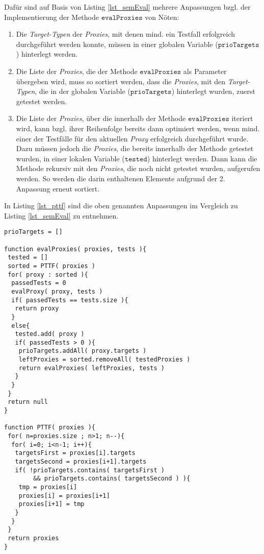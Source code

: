 \newpage
\noindent
Dafür sind auf Basis von Listing \ref{lst_semEval} mehrere Anpassungen bzgl. der Implementierung der Methode $\texttt{evalProxies}$ von Nöten:
\begin{enumerate}
\item 
Die \emph{Target-Typen} der \emph{Proxies}, mit denen mind. ein Testfall erfolgreich durchgeführt werden konnte, müssen in einer globalen Variable ($\texttt{prioTargets}$) hinterlegt werden.

\item 
Die Liste der \emph{Proxies}, die der Methode $\texttt{evalProxies}$ als Parameter übergeben wird, muss so sortiert werden, dass die \emph{Proxies}, mit den \emph{Target-Typen}, die in der globalen Variable ($\texttt{prioTargets}$) hinterlegt wurden, zuerst getestet werden. 

\item 
Die Liste der \emph{Proxies}, über die innerhalb der Methode $\texttt{evalProxies}$ iteriert wird, kann bzgl. ihrer Reihenfolge bereits dann optimiert werden, wenn mind. einer der Testfälle für den aktuellen \emph{Proxy} erfolgreich durchgeführt wurde. Dazu müssen jedoch die \emph{Proxies}, die bereits innerhalb der Methode getestet wurden, in einer lokalen Variable ($\texttt{tested}$) hinterlegt werden. Dann kann die Methode rekursiv mit den \emph{Proxies}, die noch nicht getestet wurden, aufgerufen werden. So werden die darin enthaltenen Elemente aufgrund der 2. Anpassung erneut sortiert.
\end{enumerate}  
In Listing \ref{lst_pttf} sind die oben genannten Anpassungen im Vergleich zu Listing \ref{lst_semEval} zu entnehmen.
\newpage
\begin{lstlisting}[style = pseudo, caption = Semantische Evaluation mit Heuristik \emph{PTTF}, captionpos = b, label = lst_pttf]
prioTargets = []

function evalProxies( proxies, tests ){
 tested = []
 sorted = PTTF( proxies )
 for( proxy : sorted ){
  passedTests = 0
  evalProxy( proxy, tests )
  if( passedTests == tests.size ){
   return proxy
  }
  else{
   tested.add( proxy )
   if( passedTests > 0 ){
    prioTargets.addAll( proxy.targets )
    leftProxies = sorted.removeAll( testedProxies )
    return evalProxies( leftProxies, tests )
   }
  }
 }
 return null
}

function PTTF( proxies ){
 for( n=proxies.size ; n>1; n--){
  for( i=0; i<n-1; i++){
   targetsFirst = proxies[i].targets
   targetsSecond = proxies[i+1].targets			
   if( !prioTargets.contains( targetsFirst ) 
        && prioTargets.contains( targetsSecond ) ){
    tmp = proxies[i]
    proxies[i] = proxies[i+1]
    proxies[i+1] = tmp
   }
  }
 }
 return proxies	
}
\end{lstlisting}

